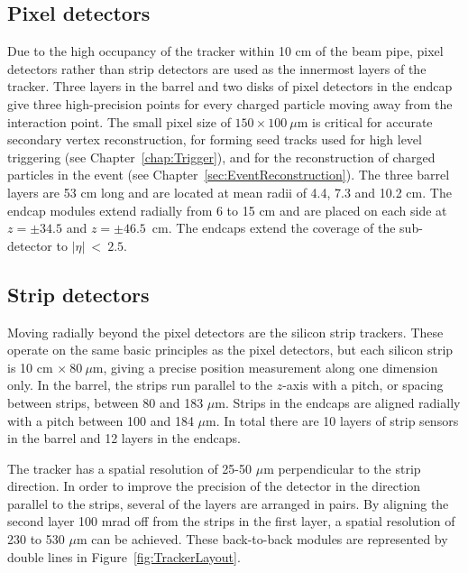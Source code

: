 \subsection{Pixel detectors}
\label{sec:TrackerPixel}

Due to the high occupancy of the tracker within 10 cm of the beam pipe, pixel detectors rather than strip detectors are used as the innermost layers of the tracker. Three layers in the barrel and two disks of pixel detectors in the endcap give three high-precision points for every charged particle moving away from the interaction point. The small pixel size of $150\times100~\mu$m is critical for accurate secondary vertex reconstruction, for forming seed tracks used for high level triggering (see Chapter~\ref{chap:Trigger}), and for the reconstruction of charged particles in the event (see Chapter~\ref{sec:EventReconstruction}). The three barrel layers are 53 cm long and are located at mean radii of 4.4, 7.3 and 10.2 cm. The endcap modules extend radially from 6 to 15 cm and are placed on each side at $z=\pm 34.5$ and $z=\pm 46.5$~cm. The endcaps extend the coverage of the sub-detector to $|\eta|~<~ 2.5$. 

\subsection{Strip detectors}
\label{sec:TrackStrip}
Moving radially beyond the pixel detectors are the silicon strip trackers. These operate on the same basic principles as the pixel detectors, but each silicon strip is 10 cm $\times~80~\mu$m, giving a precise position measurement along one dimension only. In the barrel, the strips run parallel to the $z$-axis with a pitch, or spacing between strips, between 80 and 183 $\mu$m. Strips in the endcaps are aligned radially with a pitch between 100 and 184 $\mu$m. In total there are 10 layers of strip sensors in the barrel and 12 layers in the endcaps.

The tracker has a spatial resolution of 25-50 $\mu$m perpendicular to the strip direction. In order to improve the precision of the detector in the direction parallel to the strips, several of the layers are arranged in pairs. By aligning the second layer 100 mrad off from the strips in the first layer, a spatial resolution of 230 to 530 $\mu$m can be achieved. These back-to-back modules are represented by double lines in Figure~\ref{fig:TrackerLayout}.

